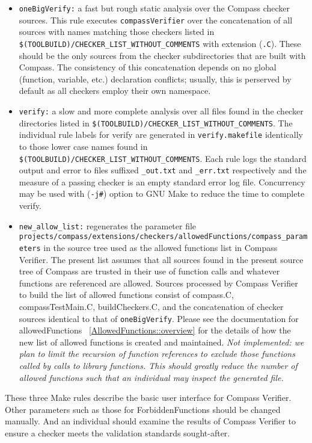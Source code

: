\begin{itemize}
\item {\tt oneBigVerify:} a fast but rough static analysis over the Compass
	checker sources. This rule executes {\tt compassVerifier} over the
	concatenation of all sources with names matching those checkers listed
	in {\tt \$(TOOLBUILD)/CHECKER\_LIST\_WITHOUT\_COMMENTS} with extension 
	({\tt .C}).
	These should be the only sources from the checker subdirectories that
	are built with Compass. The consistency of this concatenation depends
	on no global (function, variable, etc.) declaration conflicts; usually,
	this is perserved by default as all checkers employ their own namespace.
%
\item {\tt verify:} a slow and more complete analysis over all files found in
	the checker directories listed in 
	{\tt \$(TOOLBUILD)/CHECKER\_LIST\_WITHOUT\_COMMENTS}.
	The individual rule labels for verify are generated in 
	{\tt verify.makefile} identically to those lower case names found in
	{\tt \$(TOOLBUILD)/CHECKER\_LIST\_WITHOUT\_COMMENTS}. 
	Each rule logs the standard output and error to files suffixed 
	{\tt \_out.txt} and {\tt \_err.txt}
	respectively and the measure of a passing checker is an empty 
	standard error log file. Concurrency may be used with
	({\tt -j\#}) option to GNU Make to reduce the time to complete verify.
%
\item {\tt new\_allow\_list:} regenerates the parameter file 
	{\tt projects/compass/extensions/checkers/allowedFunctions/compass\_parameters} in the
	source tree used as the allowed functions list in Compass Verifier.
	The present list assumes that all sources found in the present source
	tree of Compass are trusted in their use of function calls and whatever
	functions are referenced are allowed. Sources processed by Compass
	Verifier to build the list of allowed functions consist of
	compass.C, compassTestMain.C, buildCheckers.C, and the concatenation
	of checker sources identical to that of {\tt oneBigVerify}. Please
	see the documentation for allowedFunctions
	~\ref{AllowedFunctions::overview} for the details of how
	the new list of allowed functions is created and maintained.
	{\em Not implemented: we plan to limit the recursion of function
	references to exclude those functions called by calls to library
	functions. This should greatly reduce the number of allowed functions
	such that an individual may inspect the generated file.}
\end{itemize}

These three Make rules describe the basic user interface for Compass Verifier.
Other parameters such as those for ForbiddenFunctions should be changed
manually. And an individual should examine the results of Compass Verifier
to ensure a checker meets the validation standards sought-after.
